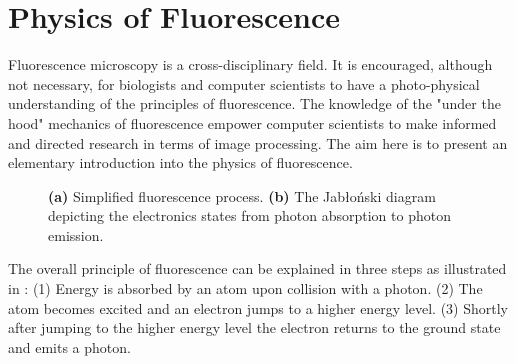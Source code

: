 \section{Physics of Fluorescence}
\label{sec:PhysicsOfFluorescence}

Fluorescence microscopy is a cross-disciplinary field.
It is encouraged, although not necessary, for biologists and computer scientists to have a photo-physical understanding of the principles of fluorescence.
The knowledge of the "under the hood" mechanics of fluorescence empower computer scientists to make informed and directed research in terms of image processing.
The aim here is to present an elementary introduction into the physics of fluorescence.

\begin{figure}[!t]
	\centering
	\caption{\textbf{(a)} Simplified fluorescence process. \textbf{(b)} The Jab{\l}o{\'n}ski diagram depicting the electronics states from photon absorption to photon emission.}
	\label{fig:fluorescence_electron_states}
\end{figure}

The overall principle of fluorescence can be explained in three steps \citep{Nobel2016} as illustrated in : 
(1) Energy is absorbed by an atom upon collision with a photon.
(2) The atom becomes excited and an electron jumps to a higher energy level.
(3) Shortly after jumping to the higher energy level the electron returns to the ground state and emits a photon.

